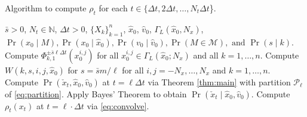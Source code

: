 \documentclass[letterpaper,10pt,conference]{ieeeconf}
\begin{document}
\begin{algorithm}[t]
		  \caption{Algorithm to compute  $\rho_t$ for each $t \in  \{\Delta t, 2 \Delta t, \dots, N_t \Delta t$\}.}
		  \label{alg:1}
		  \begin{algorithmic}[1]
		    \Require $\bar{s} > 0$, $N_t \in \mathbb{N}$, $\Delta t > 0$,  $ \{ X_k \}_{k=1}^{n}$, $\hat{x}_0$, $\hat{v}_0$, $\Gamma_L( \hat{x}_0, N_x)$, $\Pr(x_0 \mid M), \Pr(x_0 \mid \hat{x}_0), \Pr(v_0 \mid \hat{v}_0 ), \Pr(M \in \mathcal{M}), \text{ and } \Pr(s \mid k)$.
		    \State Compute $\Phi_{k,1}^{ \pm \bar{s} \ell \Delta t}( x_0^{i,j} )$ for all $x_0^{i,j} \in \Gamma_L( \hat{x}_0 ; N_x)$ and all $k=1,\dots, n$.
		    \State Compute $W(k,s,i,j,\hat{x}_0)$ for $s = \bar{s} m / \ell$ for all $i,j=-N_x,\dots, N_x$ and $k=1,\dots,n$.
		    \EndFor  
		    \State Compute $\Pr(\check{x}_t, \hat{x}_0, \hat{v}_0)$ at $t=\ell \Delta t$ via Theorem \ref{thm:main} 
		    \hspace*{12pt} with partition $\mathcal{P}_\ell$ of \eqref{eq:partition}.\label{alg1:step2}
		    \State Apply Bayes' Theorem to obtain $\Pr(\check{x}_t \mid \hat{x}_0, \hat{v}_0)$.
		    \State Compute $\rho_t(x_t)$ at $t= \ell \cdot \Delta t$ via \eqref{eq:convolve}.
		    \EndFor
		  \end{algorithmic}
\end{algorithm}

\end{document}
